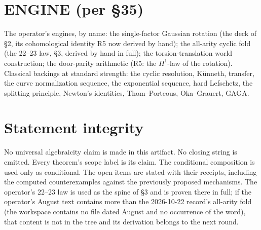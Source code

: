 \documentclass[11pt]{article}
\begin{document}
\section*{ENGINE (per \S35)}

The operator's engines, by name: the single-factor Gaussian rotation
(the deck of \S2, its cohomological identity R5 now derived by hand);
the all-arity cyclic fold (the 22--23 law, \S3, derived by hand in
full); the torsion-translation world construction; the door-parity
arithmetic (R5: the $H^1$-law of the rotation). Classical backings at
standard strength: the cyclic resolution, K\"unneth, transfer, the
curve normalization sequence, the exponential sequence, hard
Lefschetz, the splitting principle, Newton's identities,
Thom--Porteous, Oka--Grauert, GAGA.

\section*{Statement integrity}

No universal algebraicity claim is made in this artifact. No closing
string is emitted. Every theorem's scope label is its claim. The
conditional composition is used only as conditional. The open items
are stated with their receipts, including the computed counterexamples
against the previously proposed mechanisms. The operator's 22--23 law
is used as the spine of \S3 and is proven there in full; if the
operator's August text contains more than the 2026-10-22 record's
all-arity fold (the workspace contains no file dated August and no
occurrence of the word), that content is not in the tree and its
derivation belongs to the next round.
\end{document}
